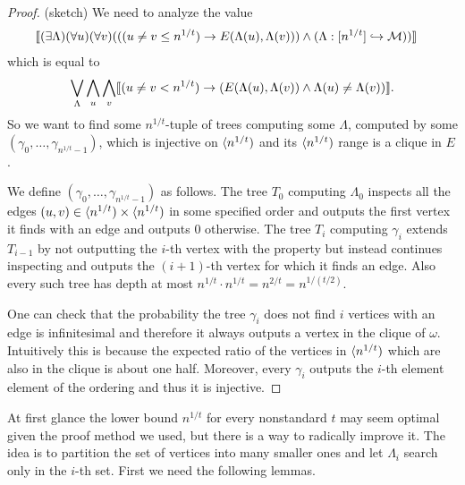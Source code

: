 \begin{proof}(sketch) We need to analyze the value
\begin{align}
&\llbracket(\exists \Lambda)(\forall u)(\forall v)(((u\not = v \leq n^{1/t})\to E(\Lambda(u),\Lambda(v)))\land(\Lambda:[n^{1/t}]\hookrightarrow\mathcal{M}))\rrbracket
\end{align}
which is equal to
\begin{align}
\bigvee_\Lambda\bigwedge_u\bigwedge_v\llbracket(u\not=v < n^{1/t})\to(E(\Lambda(u),\Lambda(v))\land\Lambda(u)\not=\Lambda(v))\rrbracket.
\end{align}
So we want to find some $n^{1/t}$-tuple of trees computing some $\Lambda$, computed by some $(\gamma_0,\dots,\gamma_{n^{1/t}-1})$, which is injective on $\langle n^{1/t})$ and its $\langle n^{1/t})$ range is a clique in $E$.

We define $(\gamma_0,\dots,\gamma_{n^{1/t}-1})$ as follows. The tree $T_0$ computing $\Lambda_0$ inspects all the edges $(u,v)\in\langle n^{1/t})\times\langle n^{1/t})$ in some specified order and outputs the first vertex it finds with an edge and outputs $0$ otherwise. The tree $T_i$ computing $\gamma_i$ extends $T_{i-1}$ by not outputting the $i$-th vertex with the property but instead continues inspecting and outputs the $(i+1)$-th vertex for which it finds an edge. Also every such tree has depth at most $n^{1/t}\cdot n^{1/t}=n^{2/t}=n^{1/(t/2)}$.

One can check that the probability the tree $\gamma_i$ does not find $i$ vertices with an edge is infinitesimal and therefore it always outputs a vertex in the clique of $\omega$. Intuitively this is because the expected ratio of the vertices in $\langle n^{1/t})$ which are also in the clique is about one half. Moreover, every $\gamma_i$ outputs the $i$-th element element of the ordering and thus it is injective.
\end{proof}

At first glance the lower bound $n^{1/t}$ for every nonstandard $t$ may seem optimal given the proof method we used, but there is a way to radically improve it. The idea is to partition the set of vertices into many smaller ones and let $\Lambda_i$ search only in the $i$-th set. First we need the following lemmas.


